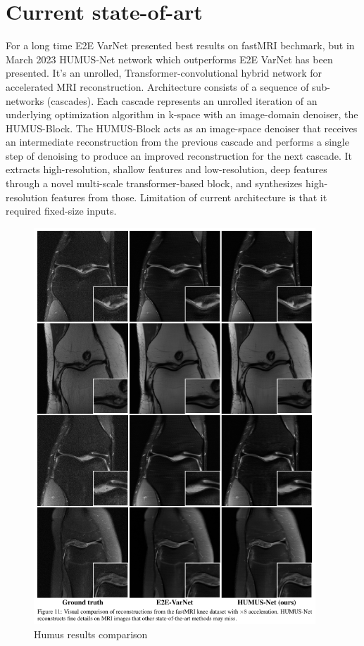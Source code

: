 \documentclass[10pt,a4paper]{article}
\begin{document}
\section{Current state-of-art}

For a long time E2E VarNet presented best results on fastMRI bechmark, but in March 2023 HUMUS-Net network which outperforms E2E VarNet has been presented. It's an unrolled, Transformer-convolutional hybrid network for accelerated MRI reconstruction. Architecture consists of a sequence of sub-networks (cascades). Each cascade represents an unrolled iteration of an underlying optimization algorithm in k-space with an image-domain denoiser, the HUMUS-Block. The HUMUS-Block acts as an image-space denoiser that receives an intermediate reconstruction from the previous cascade and performs a single step of denoising to produce an improved reconstruction for the next cascade. It extracts high-resolution, shallow features and low-resolution, deep features through a novel multi-scale transformer-based block, and synthesizes high-resolution features from those. Limitation of current architecture is that it required fixed-size inputs.

\begin{figure}[H]
\centering
\includegraphics[width=300pt]{./images/humus-comparison.png}
\caption{Humus results comparison}
\end{figure}
\end{document}
